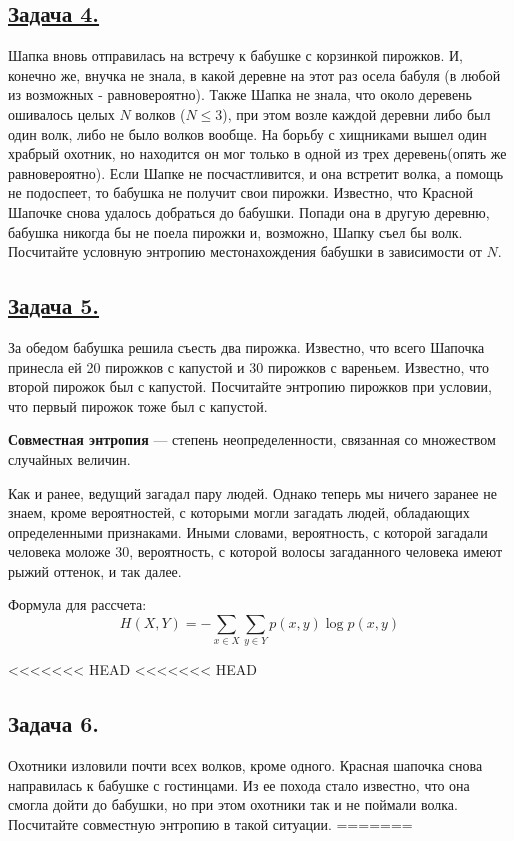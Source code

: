 \subsection*{\hyperref[sec:sol_problem4]{Задача 4.}}\label{sec:problem4} Шапка вновь отправилась на встречу к бабушке с корзинкой пирожков. И, конечно же, внучка не знала, в какой деревне на этот раз осела бабуля (в любой из возможных - равновероятно). Также Шапка не знала, что около деревень ошивалось целых $N$ волков ($N\leqslant3$), при этом возле каждой деревни либо был один волк, либо не было волков вообще. На борьбу с хищниками вышел один храбрый охотник, но находится он мог только в одной из трех деревень(опять же равновероятно). Если Шапке не посчастливится, и она встретит волка, а помощь не подоспеет, то бабушка не получит свои пирожки. Известно, что Красной Шапочке снова удалось добраться до бабушки. Попади она в другую деревню, бабушка никогда бы не поела пирожки и, возможно, Шапку съел бы волк. Посчитайте условную энтропию местонахождения бабушки в зависимости от $N$. 
\\

\subsection*{\hyperref[sec:sol_problem5]{Задача 5.}}\label{sec:problem5} За обедом бабушка решила съесть два пирожка. Известно, что всего Шапочка принесла ей 20 пирожков с капустой и 30 пирожков с вареньем. Известно, что второй пирожок был с капустой. Посчитайте энтропию пирожков при условии, что первый пирожок тоже был с капустой.

\begin{siderules}
    \textbf{Совместная энтропия} --- степень неопределенности, связанная со множеством случайных величин.
\end{siderules}

Как и ранее, ведущий загадал пару людей. Однако теперь мы ничего заранее не знаем, кроме вероятностей, с которыми могли загадать людей, обладающих определенными признаками. Иными словами, вероятность, с которой загадали человека моложе 30, вероятность, с которой волосы загаданного человека имеют рыжий оттенок, и так далее.

Формула для рассчета:
\[H(X, Y)=-\sum\limits_{x\in X}\sum\limits_{y\in Y} p(x, y)\log p(x ,y) \]

<<<<<<< HEAD
<<<<<<< HEAD
\subsection*{Задача 6.} Охотники изловили почти всех волков, кроме одного. Красная шапочка снова направилась к бабушке с гостинцами. Из ее похода стало известно, что она смогла дойти до бабушки, но при этом охотники так и не поймали волка. Посчитайте совместную энтропию в такой ситуации. 
=======
